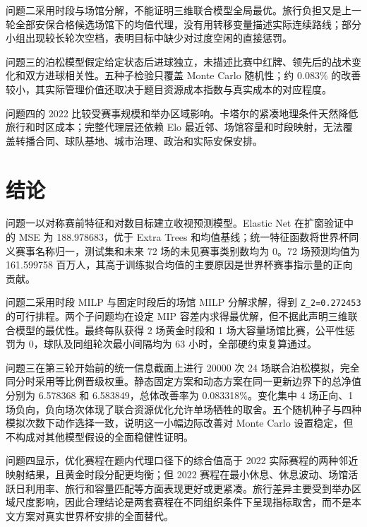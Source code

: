 问题二采用时段与场馆分解，不能证明三维联合模型全局最优。旅行负担又是上一轮全部安保合格候选场馆下的均值代理，没有用转移变量描述实际连续路线；部分小组出现较长轮次空档，表明目标中缺少对过度空闲的直接惩罚。

问题三的泊松模型假定给定状态后进球独立，未描述比赛中红牌、领先后的战术变化和双方进球相关性。五种子检验只覆盖 Monte Carlo 随机性；约 0.083\% 的改善较小，其实际管理价值还取决于题目资源成本指数与真实成本的对应程度。

问题四的 2022 比较受赛事规模和举办区域影响。卡塔尔的紧凑地理条件天然降低旅行和时区成本；完整代理层还依赖 Elo 最近邻、场馆容量和时段映射，无法覆盖转播合同、球队基地、城市治理、政治和实际安保安排。

\section{结论}

问题一以对称赛前特征和对数目标建立收视预测模型。Elastic Net 在扩窗验证中的 MSE 为 188.978683，优于 Extra Trees 和均值基线；统一特征函数将世界杯同义赛事名称归一，测试集和未来 72 场的未见赛事类别数均为 0。72 场预测均值为 161.599758 百万人，其高于训练拟合均值的主要原因是世界杯赛事指示量的正向贡献。

问题二采用时段 MILP 与固定时段后的场馆 MILP 分解求解，得到 \texttt{Z\_2=0.272453} 的可行排程。两个子问题均在设定 MIP 容差内求得最优解，但不据此声明三维联合模型的最优性。最终每队获得 2 场黄金时段和 1 场大容量场馆比赛，公平性惩罚为 0，球队及同组轮次最小间隔均为 63 小时，全部硬约束复算通过。

问题三在第三轮开始前的统一信息截面上进行 20000 次 24 场联合泊松模拟，完全同分时采用等比例晋级权重。静态固定方案和动态方案在同一更新边界下的总净值分别为 6.578368 和 6.583849，总体改善率为 0.083318\%。变化集中 4 场正向、1 场负向，负向场次体现了联合资源优化允许单场牺牲的取舍。五个随机种子与四种模拟次数下动作选择一致，说明这一小幅边际改善对 Monte Carlo 设置稳定，但不构成对其他模型假设的全面稳健性证明。

问题四显示，优化赛程在题内代理口径下的综合值高于 2022 实际赛程的两种邻近映射结果，且黄金时段分配更均衡；但 2022 赛程在最小休息、休息波动、场馆活跃日利用率、旅行和容量匹配等方面表现更好或更紧凑。旅行差异主要受到举办区域尺度影响，因此合理结论是两套赛程在不同组织条件下呈现指标取舍，而不是本文方案对真实世界杯安排的全面替代。
